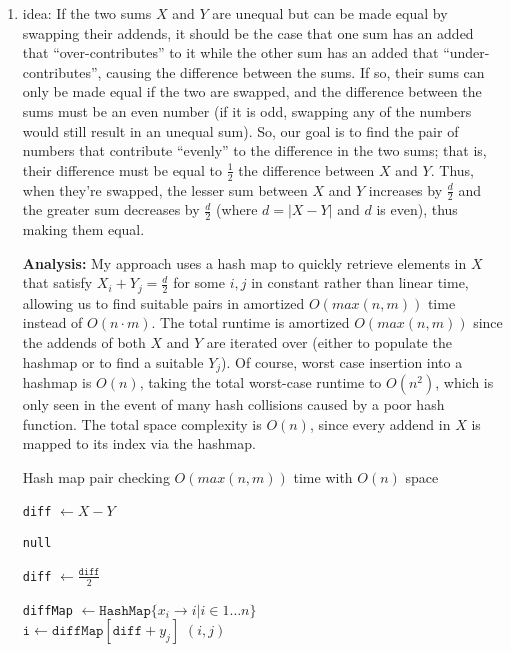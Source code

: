 \documentclass[12pt]{article}
\begin{document}
\begin{enumerate}
    \item idea: If the two sums $X$ and $Y$ are unequal but can be made equal by swapping their addends, it should be the 
    case that one sum has an added that ``over-contributes'' to it while the other sum has an added that ``under-contributes'', causing the 
    difference between the sums. If so, their sums can only be made equal if the two are swapped, and the difference between the sums must 
    be an even number (if it is odd, swapping any of the numbers would still result in an unequal sum). So, our goal is to 
    find the pair of numbers that contribute ``evenly'' to the difference in the two sums; that is, their difference must be 
    equal to $\frac{1}{2}$ the difference between $X$ and $Y$. Thus, when they're swapped, the lesser sum between $X$ and $Y$ 
    increases by $\frac{d}{2}$ and the greater sum decreases by $\frac{d}{2}$ (where $d = |X - Y|$ and $d$ is even), thus making them equal.

    \textbf{Analysis:} My approach uses a hash map to quickly retrieve elements in $X$ that satisfy $X_i + Y_j = \frac{d}{2}$ for some $i, j$ in 
    constant rather than linear time, allowing us to find suitable pairs in amortized $O(max(n, m))$ time instead of $O(n \cdot m)$.
    The total runtime is amortized $O(max(n, m))$ since the addends of both $X$ and $Y$ are iterated over (either to populate the hashmap or to find a suitable $Y_j$). Of course, worst 
    case insertion into a hashmap is $O(n)$, taking the total worst-case runtime to $O(n^2)$, which is only seen in the event of 
    many hash collisions caused by a poor hash function. The total space complexity is $O(n)$, since every addend in $X$ is mapped to its index via the hashmap.

    \begin{algorithm}
        \caption{Hash map pair checking $O(max(n, m))$ time with $O(n)$ space}
        \begin{algorithmic}
            \State \texttt{diff} $\gets X - Y$

                \State \Return \texttt{null}
            \EndIf

            \State \texttt{diff} $\gets \frac{\texttt{diff}}{2}$

            \State \texttt{diffMap} $ \gets \texttt{HashMap}\{x_i \rightarrow i | i \in 1 \dots n\}$\\

                    \State $\texttt{i} \gets \texttt{diffMap}[\texttt{diff} + y_j]$
                    \State \Return $(i, j)$
                \EndIf
            \EndFor
        \end{algorithmic}
    \end{algorithm}


\end{enumerate}
\end{document}
